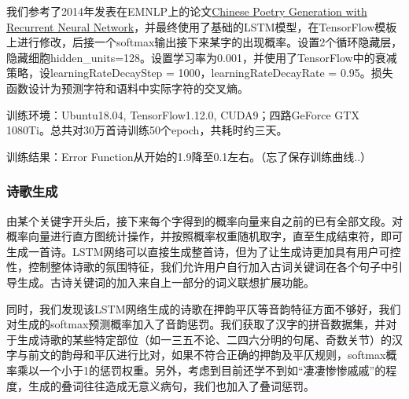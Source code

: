 \documentclass[a4paper, 10pt]{article}
\begin{document}
我们参考了2014年发表在EMNLP上的论文\href{http://aclweb.org/anthology/D/D14/D14-1074.pdf}{Chinese Poetry Generation with Recurrent Neural Network}，并最终使用了基础的LSTM模型，在TensorFlow模板上进行修改，后接一个softmax输出接下来某字的出现概率。设置2个循环隐藏层，隐藏细胞hidden\_units=128。设置学习率为0.001，并使用了TensorFlow中的衰减策略，设learningRateDecayStep = 1000，learningRateDecayRate = 0.95。损失函数设计为预测字符和语料中实际字符的交叉熵。

训练环境：Ubuntu18.04, TensorFlow1.12.0, CUDA9；四路GeForce GTX 1080Ti。总共对30万首诗训练50个epoch，共耗时约三天。

训练结果：Error Function从开始的1.9降至0.1左右。（忘了保存训练曲线..）

\subsubsection*{诗歌生成}
由某个关键字开头后，接下来每个字得到的概率向量来自之前的已有全部文段。对概率向量进行直方图统计操作，并按照概率权重随机取字，直至生成结束符，即可生成一首诗。LSTM网络可以直接生成整首诗，但为了让生成诗更加具有用户可控性，控制整体诗歌的氛围特征，我们允许用户自行加入古词关键词在各个句子中引导生成。古诗关键词的加入来自上一部分的词义联想扩展功能。

同时，我们发现该LSTM网络生成的诗歌在押韵平仄等音韵特征方面不够好，我们对生成的softmax预测概率加入了音韵惩罚。我们获取了汉字的拼音数据集，并对于生成诗歌的某些特定部位（如一三五不论、二四六分明的句尾、奇数关节）的汉字与前文的韵母和平仄进行比对，如果不符合正确的押韵及平仄规则，softmax概率乘以一个小于1的惩罚权重。另外，考虑到目前还学不到如“凄凄惨惨戚戚”的程度，生成的叠词往往造成无意义病句，我们也加入了叠词惩罚。
\end{document}
